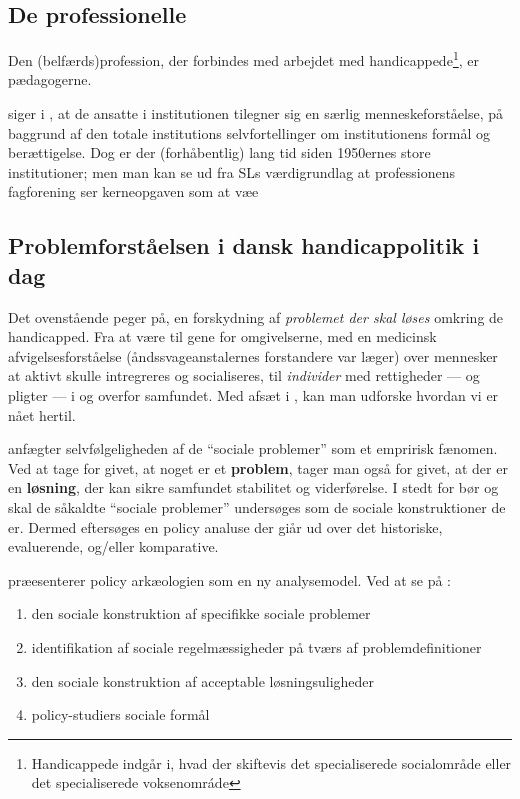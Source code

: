 \subsection{De professionelle}
 Den (belfærds)profession, der forbindes med arbejdet med handicappede\footnote{Handicappede indgår i, hvad der skiftevis det specialiserede socialområde eller det specialiserede voksenomráde}, er pædagogerne.

\citeauthor{goffmanAsylumsEssaysSocial1991} siger i , at de ansatte  i institutionen tilegner sig en særlig menneskeforståelse, på baggrund af den totale institutions selvfortellinger om institutionens formål og berættigelse.
Dog er der (forhåbentlig) lang tid siden 1950ernes store institutioner; men man kan se ud fra SLs værdigrundlag at professionens fagforening ser kerneopgaven som at væe

\subsection{Problemforståelsen i dansk handicappolitik i dag}
Det ovenstående peger på, en forskydning af \textit{problemet der skal løses} omkring de handicapped.
Fra at være til gene for omgivelserne, med en medicinsk afvigelsesforståelse (åndssvageanstalernes forstandere var læger) over mennesker at aktivt skulle intregreres og socialiseres, til \textit{individer} med rettigheder — og pligter — i og overfor samfundet.
Med afsæt i \citeauthor{scheurichPolicyArchaeologyNew1994}, kan man udforske hvordan vi er nået hertil.

\citeauthor{scheurichPolicyArchaeologyNew1994}  anfægter selvfølgeligheden af de “sociale problemer” som et empririsk fænomen.
Ved at tage for givet, at noget er et \textbf{problem}, tager man også for givet, at der er en \textbf{løsning}, der kan sikre samfundet stabilitet og viderførelse.
I stedt for bør og skal de såkaldte “sociale problemer” undersøges som de sociale konstruktioner de er.
Dermed eftersøges en policy analuse der giår ud over det historiske, evaluerende, og/eller komparative.

\citeauthor{scheurichPolicyArchaeologyNew1994} præesenterer policy arkæologien som en ny analysemodel. Ved at se på \cite[s. 300]{scheurichPolicyArchaeologyNew1994}:
\begin{enumerate}
  \item
    den sociale konstruktion af specifikke sociale problemer
  \item
    identifikation af sociale regelmæssigheder på tværs af problemdefinitioner
  \item
    den sociale konstruktion af acceptable løsningsuligheder
  \item
    policy-studiers sociale formål
\end{enumerate}

